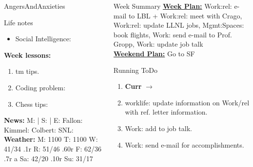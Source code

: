 \begin{columns}
\begin{column}{0.10\linewidth}
\begin{block}{AngersAndAnxieties}
\begin{itemize}
      \end{itemize}
    \end{block}
      \begin{block}{Life notes}
        \begin{itemize}
          \tiny \item \tiny Social Intelligence: 
        \end{itemize}
      \end{block}
      \begin{block}
        {\tiny {\bf Week lessons:}}
        \begin{enumerate}
        \item \tiny tm tips. 
        \item \tiny Coding problem:
        \item \tiny Chess tips: 
        \end{enumerate}
            {{\tiny {\tiny \bf  News:}} {\tiny  M:  | S: 
                | E: Fallon:  Kimmel:  Colbert: SNL:}}
            {{\tiny {\tiny \bf  Weather:}} {\tiny M: 1100 T: 1100 W: 41/34 .1r 
                 R: 51/46 .60r F: 62/36 .7r a Sa: 42/20 .10r Su: 31/17 }}
      \end{block}
  \end{column}
  \begin{column}{0.6\linewidth}
    \begin{block}{Week Summary}
      {\underline {\bf Week Plan:} 
        Work:rel: e-mail to LBL + Work:rel: meet with Crago, Work:rel: update LLNL jobs, Mgmt:Spaces: book flights, 
        Work: send e-mail to Prof. Gropp, Work: update job talk
      }\\

      {\underline{\bf Weekend Plan:} Go to SF } \\
  
    \end{block}
    \begin{block}{Running ToDo} %
      \begin{enumerate}  
      \item \tiny \textbf{Curr} $\rightarrow$  
      \item \tiny worklife: update information on Work/rel with ref. letter information.  
        
      \item \tiny Work: add to job talk. 
      \item \tiny Work: send e-mail for accomplishments. 


\end{enumerate}
\end{block}
\end{column}
\end{columns}
